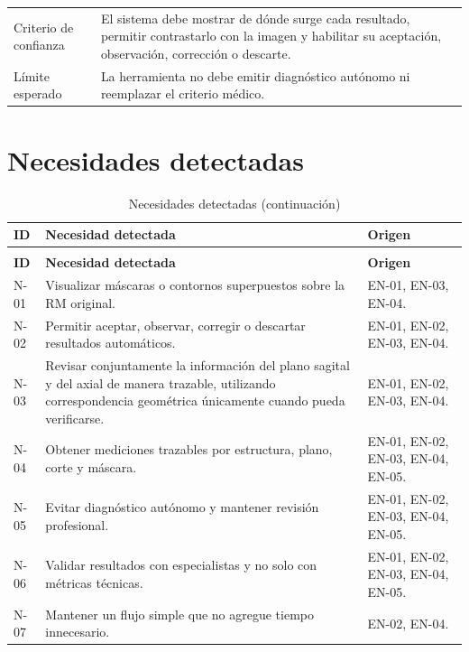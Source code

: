{\begin{longtable}{>{\raggedright\arraybackslash}p{} >{\raggedright\arraybackslash}p{}}
Criterio de confianza & El sistema debe mostrar de dónde surge cada resultado, permitir contrastarlo con la imagen y habilitar su aceptación, observación, corrección o descarte. \\
Límite esperado & La herramienta no debe emitir diagnóstico autónomo ni reemplazar el criterio médico. \\
\hline
\end{longtable}
}

\section{Necesidades detectadas}

{\small
\setlength{\LTleft}{0pt}
\setlength{\LTright}{0pt}
\renewcommand{\arraystretch}{1.18}
\setlength{\tabcolsep}{3pt}
\begin{longtable}{>{\raggedright\arraybackslash}p{} >{\raggedright\arraybackslash}p{} >{\raggedright\arraybackslash}p{}}
\caption{Necesidades detectadas}\label{tab:user-research-necesidades}\\
\hline
\textbf{ID} & \textbf{Necesidad detectada} & \textbf{Origen} \\
\hline
\endfirsthead
\caption[]{Necesidades detectadas (continuación)}\\
\hline
\textbf{ID} & \textbf{Necesidad detectada} & \textbf{Origen} \\
\hline
\endhead
\hline
\endfoot
N-01 & Visualizar máscaras o contornos superpuestos sobre la RM original. & EN-01, EN-03, EN-04. \\
N-02 & Permitir aceptar, observar, corregir o descartar resultados automáticos. & EN-01, EN-02, EN-03, EN-04. \\
N-03 & Revisar conjuntamente la información del plano sagital y del axial de manera trazable, utilizando correspondencia geométrica únicamente cuando pueda verificarse. & EN-01, EN-02, EN-03, EN-04. \\
N-04 & Obtener mediciones trazables por estructura, plano, corte y máscara. & EN-01, EN-02, EN-03, EN-04, EN-05. \\
N-05 & Evitar diagnóstico autónomo y mantener revisión profesional. & EN-01, EN-02, EN-03, EN-04, EN-05. \\
N-06 & Validar resultados con especialistas y no solo con métricas técnicas. & EN-01, EN-02, EN-03, EN-04, EN-05. \\
N-07 & Mantener un flujo simple que no agregue tiempo innecesario. & EN-02, EN-04. \\

\end{longtable}}
